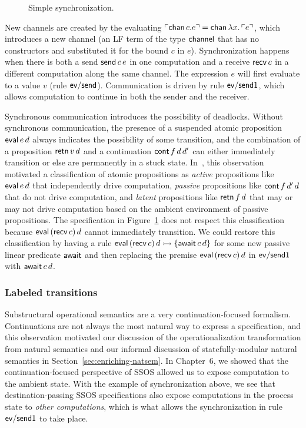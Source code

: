 \begin{figure}
\caption{Simple synchronization.}
\label{fig:dest-synch}
\end{figure}

New channels are created by the evaluating ${\ulcorner{{\sf chan}\,c.e}\urcorner} =
{\sf chan}\,\lambda x.\,{\ulcorner{e}\urcorner}$, which introduces a new channel
(an LF term of the type ${\sf channel}$ that has no constructors and
substituted it for the bound $c$ in $e$). Synchronization happens when
there is both a send ${\sf send}\,c\,e$ in one computation and a
receive ${\sf recv}\,c$ in a different computation along the same
channel. The expression $e$ will first evaluate to a value $v$ 
(rule ${\sf ev/send}$). Communication is
driven by rule ${\sf ev/send1}$, which allows computation to continue
in both the sender and the receiver.

Synchronous communication introduces the possibility of
deadlocks. Without synchronous communication, the presence of a
suspended atomic proposition ${\sf eval}\,e\,d$ always indicates the
possibility of some transition, and the combination of a proposition
${\sf retn}\,v\,d$ and a continuation ${\sf cont}\,f\,d\,d'$ can
either immediately transition or else are permanently in a stuck
state. In~\cite{pfenning09substructural}, this observation motivated a
classification of atomic propositions as {\it active} propositions
like ${\sf eval}\,e\,d$ that independently drive computation, {\it
  passive} propositions like ${\sf cont}\,f\,d'\,d$ that do not drive
computation, and {\it latent} propositions like ${\sf retn}\,f\,d$
that may or may not drive computation based on the ambient environment
of passive propositions. The specification in
Figure~\ref{fig:dest-synch} does not respect this classification
because ${\sf eval}\,({\sf recv}\,c)\,d$ cannot immediately
transition. We could restore this classification by having a rule
${\sf eval}\,({\sf recv}\,c)\,d \rightarrowtail \{ {\sf await}\,c\,d \}$ for
some new passive linear predicate ${\sf await}$ and then replacing the
premise ${\sf eval}\,({\sf recv}\,c)\,d$ in ${\sf ev/send1}$ with
${\sf await}\,c\,d$.

\subsubsection{Labeled transitions}

Substructural  operational semantics  are a  very continuation-focused
formalism.  Continuations  are not  always  the  most  natural way  to
express a specification, and this observation motivated our discussion
of  the operationalization transformation  from natural  semantics and
our  informal discussion  of statefully-modular  natural  semantics in
Section~\ref{sec:enriching-natsem}.  In Chapter~6,  we showed that the
continuation-focused  perspective   of  SSOS  allowed   us  to  expose
computation to the ambient  state. With the example of synchronization
above, we see that destination-passing SSOS specifications also expose
computations in  the process state to {\it  other computations}, which
is what  allows the synchronization  in rule ${\sf ev/send1}$  to take
place.

